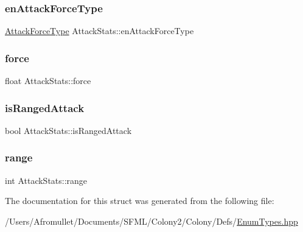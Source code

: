 \mbox{\label{struct_attack_stats_a9b9650abd264559a4a8914a67b070c1e}} 
\subsubsection{\texorpdfstring{en\+Attack\+Force\+Type}{enAttackForceType}}
{\footnotesize\ttfamily \mbox{\hyperlink{_enum_types_8hpp_ad893f9959c49f07fb713f13630b7ee2d}{Attack\+Force\+Type}} Attack\+Stats\+::en\+Attack\+Force\+Type}

\mbox{\label{struct_attack_stats_ab351196c612dedf32664a1f1c98f49d0}} 
\subsubsection{\texorpdfstring{force}{force}}
{\footnotesize\ttfamily float Attack\+Stats\+::force}

\mbox{\label{struct_attack_stats_ae520cb405184191eef7d816e6ade41e4}} 
\subsubsection{\texorpdfstring{is\+Ranged\+Attack}{isRangedAttack}}
{\footnotesize\ttfamily bool Attack\+Stats\+::is\+Ranged\+Attack}

\mbox{\label{struct_attack_stats_a6c771cd1408f202aa1c6b8bb0fff353b}} 
\subsubsection{\texorpdfstring{range}{range}}
{\footnotesize\ttfamily int Attack\+Stats\+::range}



The documentation for this struct was generated from the following file\+:\begin{DoxyCompactItemize}
\item 
/\+Users/\+Afromullet/\+Documents/\+S\+F\+M\+L/\+Colony2/\+Colony/\+Defs/\mbox{\hyperlink{_enum_types_8hpp}{Enum\+Types.\+hpp}}\end{DoxyCompactItemize}
